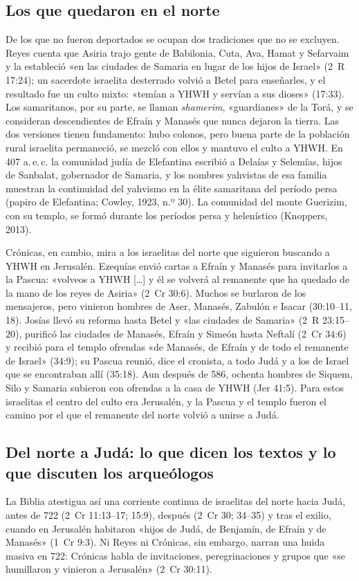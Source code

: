 \subsection{Los que quedaron en el norte}
De los que no fueron deportados se ocupan dos tradiciones que no se excluyen. Reyes cuenta que Asiria trajo gente de Babilonia, Cuta, Ava, Hamat y Sefarvaim y la estableció «en las ciudades de Samaria en lugar de los hijos de Israel» (2~R 17:24); un sacerdote israelita desterrado volvió a Betel para enseñarles, y el resultado fue un culto mixto: «temían a YHWH y servían a sus dioses» (17:33). Los samaritanos, por su parte, se llaman \emph{shamerim}, «guardianes» de la Torá, y se consideran descendientes de Efraín y Manasés que nunca dejaron la tierra. Las dos versiones tienen fundamento: hubo colonos, pero buena parte de la población rural israelita permaneció, se mezcló con ellos y mantuvo el culto a YHWH. En 407 a.\,e.\,c. la comunidad judía de Elefantina escribió a Delaías y Selemías, hijos de Sanbalat, gobernador de Samaria, y los nombres yahvistas de esa familia muestran la continuidad del yahvismo en la élite samaritana del período persa (papiro de Elefantina; Cowley, 1923, n.º 30). La comunidad del monte Guerizim, con su templo, se formó durante los períodos persa y helenístico (Knoppers, 2013).

Crónicas, en cambio, mira a los israelitas del norte que siguieron buscando a YHWH en Jerusalén. Ezequías envió cartas a Efraín y Manasés para invitarlos a la Pascua: «volveos a YHWH [\ldots] y él se volverá al remanente que ha quedado de la mano de los reyes de Asiria» (2~Cr 30:6). Muchos se burlaron de los mensajeros, pero vinieron hombres de Aser, Manasés, Zabulón e Isacar (30:10--11, 18). Josías llevó su reforma hasta Betel y «las ciudades de Samaria» (2~R 23:15--20), purificó las ciudades de Manasés, Efraín y Simeón hasta Neftalí (2~Cr 34:6) y recibió para el templo ofrendas «de Manasés, de Efraín y de todo el remanente de Israel» (34:9); su Pascua reunió, dice el cronista, a todo Judá y a los de Israel que se encontraban allí (35:18). Aun después de 586, ochenta hombres de Siquem, Silo y Samaria subieron con ofrendas a la casa de YHWH (Jer 41:5). Para estos israelitas el centro del culto era Jerusalén, y la Pascua y el templo fueron el camino por el que el remanente del norte volvió a unirse a Judá.

\subsection{Del norte a Judá: lo que dicen los textos y lo que discuten los arqueólogos}
La Biblia atestigua así una corriente continua de israelitas del norte hacia Judá, antes de 722 (2~Cr 11:13--17; 15:9), después (2~Cr 30; 34--35) y tras el exilio, cuando en Jerusalén habitaron «hijos de Judá, de Benjamín, de Efraín y de Manasés» (1~Cr 9:3). Ni Reyes ni Crónicas, sin embargo, narran una huida masiva en 722: Crónicas habla de invitaciones, peregrinaciones y grupos que «se humillaron y vinieron a Jerusalén» (2~Cr 30:11).

